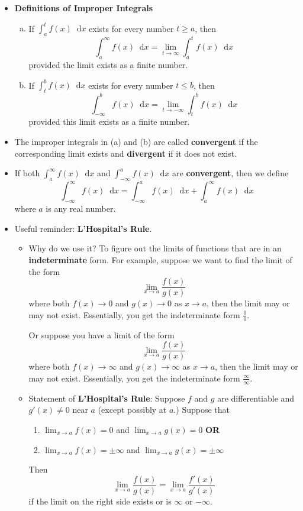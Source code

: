\documentclass[11pt]{article}
\theoremstyle{definition}
\theoremstyle{remark}
\newcommand*\diff{\mathop{}\!\mathrm{d}}
\begin{document}
\begin{itemize}

\item \textbf{Definitions of Improper Integrals}
\begin{enumerate}[(a)]
\item If $\displaystyle \int_a^t f(x) \diff x$ exists for every number $t\geq a$, then
$$
\int_a^\infty f(x) \diff x = \lim_{t \rightarrow \infty} \int_a^t f(x) \diff x
$$
provided the limit exists as a finite number. 
\item If $\displaystyle \int_t^b f(x) \diff x $ exists for every number $t \leq b$, then 
$$
\int_{-\infty}^b f(x) \diff x = \lim_{t \rightarrow -\infty} \int_t^b f(x) \diff x
$$
provided this limit exists as a finite number.
\end{enumerate}
\item The improper integrals in (a) and (b) are called \textbf{convergent} if the corresponding limit exists and \textbf{divergent} if it does not exist.
\item If both $\displaystyle \int_a^\infty f(x) \diff x$ and $\displaystyle \int_{-\infty}^a f(x) \diff x$ are \textbf{convergent}, then we define
$$
\int_{-\infty}^{\infty} f(x) \diff x = \int_{-\infty}^a f(x) \diff x + \int_a^\infty f(x) \diff x
$$
where $a$ is any real number.
\item Useful reminder: \textbf{L'Hospital's Rule}. 
\begin{itemize}
\item Why do we use it? To figure out the limits of functions that are in an \textbf{indeterminate} form. For example, suppose we want to find the limit of the form
$$
\lim_{x\rightarrow a}\frac{f(x)}{g(x)}
$$
where both $f(x) \rightarrow 0$ and $g(x) \rightarrow 0$ as $x \rightarrow a$, then the limit may or may not exist. Essentially, you get the indeterminate form $\frac{0}{0}$. 

Or suppose you have a limit of the form 
$$
\lim_{x\rightarrow a}\frac{f(x)}{g(x)}
$$
where both $f(x) \rightarrow \infty$ and $g(x) \rightarrow \infty$ as $x \rightarrow a$, then the limit may or may not exist. Essentially, you get the indeterminate form $\frac{\infty}{\infty}$. 
\item Statement of \textbf{L'Hospital's Rule}: Suppose $f$ and $g$ are differentiable and $g'(x)\neq 0$ near $a$ (except possibly at $a$.) Suppose that
\begin{enumerate}
\item $\lim_{x\rightarrow a} f(x) = 0$ and $\lim_{x\rightarrow a} g(x) = 0$ \quad \textbf{OR} 
\item $\lim_{x\rightarrow a} f(x) = \pm \infty$ and $\lim_{x\rightarrow a} g(x) = \pm \infty$
\end{enumerate}
Then
$$
\lim_{x\rightarrow a}\frac{f(x)}{g(x)} = \lim_{x\rightarrow a}\frac{f'(x)}{g'(x)}
$$
if the limit on the right side exists or is $\infty$ or $-\infty$. 
\end{itemize}
\end{itemize}
\end{document}
